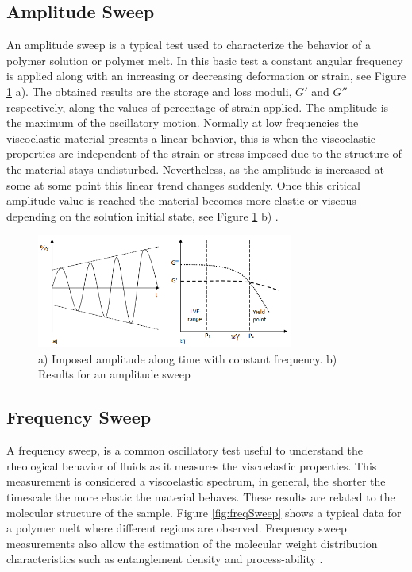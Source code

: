 \subsection{Amplitude Sweep}
An amplitude sweep is a typical test used to characterize the behavior of a polymer
solution or polymer melt. In this basic test a constant angular frequency is applied along with an increasing or decreasing deformation or strain, see Figure \ref{fig:ampSweep} a). The obtained results are the storage and loss moduli, $G'$ and $G''$ respectively, along the values of percentage of strain applied. The amplitude is the maximum of the oscillatory motion. Normally at low frequencies the viscoelastic material presents a linear behavior, this is when the viscoelastic properties are independent of the strain or stress imposed due to the structure of the material stays undisturbed. Nevertheless, as the amplitude is increased at some at some point this linear trend changes suddenly. Once this critical amplitude value is reached the material becomes more elastic or viscous depending on the solution initial state, see Figure \ref{fig:ampSweep} b) \cite{Flores2017}.

\begin{figure}[th]
\centering
\includegraphics[width=0.75\textwidth]{./Figures/ampSweep.png}
\decoRule
\caption[Amplitude Sweep]{a) Imposed amplitude along time with constant frequency. b) Results for an amplitude sweep \cite{Flores2017}}
\label{fig:ampSweep}
\end{figure}

\subsection{Frequency Sweep}
A frequency sweep, is a common oscillatory test useful to understand the rheological behavior of fluids as it measures the viscoelastic properties. This measurement is considered a viscoelastic spectrum, in general, the shorter the timescale the more elastic the material behaves. These results are related to the molecular structure of the sample. Figure \ref{fig:freqSweep} shows a typical data for a polymer melt where different regions are observed. Frequency sweep measurements also allow the estimation of the molecular weight distribution characteristics such as entanglement density and process-ability \cite{Flores2017}. 

